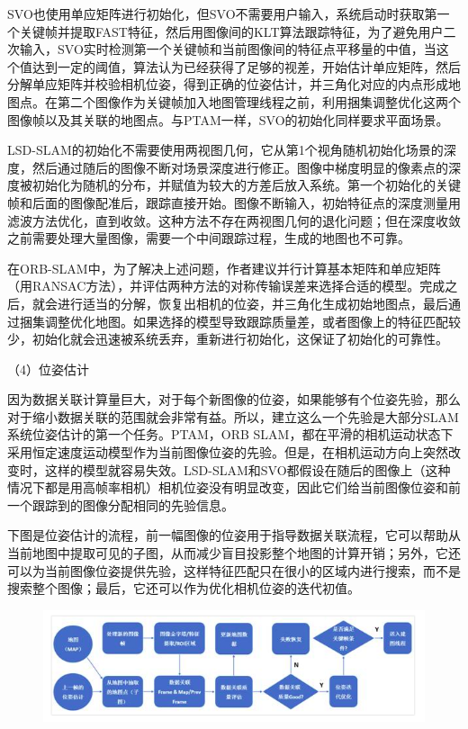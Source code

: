 SVO也使用单应矩阵进行初始化，但SVO不需要用户输入，系统启动时获取第一个关键帧并提取FAST特征，然后用图像间的KLT算法跟踪特征，为了避免用户二次输入，SVO实时检测第一个关键帧和当前图像间的特征点平移量的中值，当这个值达到一定的阈值，算法认为已经获得了足够的视差，开始估计单应矩阵，然后分解单应矩阵并校验相机位姿，得到正确的位姿估计，并三角化对应的内点形成地图点。在第二个图像作为关键帧加入地图管理线程之前，利用捆集调整优化这两个图像帧以及其关联的地图点。与PTAM一样，SVO的初始化同样要求平面场景。

LSD-SLAM的初始化不需要使用两视图几何，它从第1个视角随机初始化场景的深度，然后通过随后的图像不断对场景深度进行修正。图像中梯度明显的像素点的深度被初始化为随机的分布，并赋值为较大的方差后放入系统。第一个初始化的关键帧和后面的图像配准后，跟踪直接开始。图像不断输入，初始特征点的深度测量用滤波方法优化，直到收敛。这种方法不存在两视图几何的退化问题；但在深度收敛之前需要处理大量图像，需要一个中间跟踪过程，生成的地图也不可靠。

在ORB-SLAM中，为了解决上述问题，作者建议并行计算基本矩阵和单应矩阵（用RANSAC方法），并评估两种方法的对称传输误差来选择合适的模型。完成之后，就会进行适当的分解，恢复出相机的位姿，并三角化生成初始地图点，最后通过捆集调整优化地图。如果选择的模型导致跟踪质量差，或者图像上的特征匹配较少，初始化就会迅速被系统丢弃，重新进行初始化，这保证了初始化的可靠性。

（4）位姿估计

因为数据关联计算量巨大，对于每个新图像的位姿，如果能够有个位姿先验，那么对于缩小数据关联的范围就会非常有益。所以，建立这么一个先验是大部分SLAM系统位姿估计的第一个任务。PTAM，ORB SLAM，都在平滑的相机运动状态下采用恒定速度运动模型作为当前图像位姿的先验。但是，在相机运动方向上突然改变时，这样的模型就容易失效。LSD-SLAM和SVO都假设在随后的图像上（这种情况下都是用高帧率相机）相机位姿没有明显改变，因此它们给当前图像位姿和前一个跟踪到的图像分配相同的先验信息。

下图是位姿估计的流程，前一幅图像的位姿用于指导数据关联流程，它可以帮助从当前地图中提取可见的子图，从而减少盲目投影整个地图的计算开销；另外，它还可以为当前图像位姿提供先验，这样特征匹配只在很小的区域内进行搜索，而不是搜索整个图像；最后，它还可以作为优化相机位姿的迭代初值。
\begin{figure}[H]%
	\centering  %
	\includegraphics[width=0.7\linewidth]{image/Talk/19.png}  %

\end{figure}

